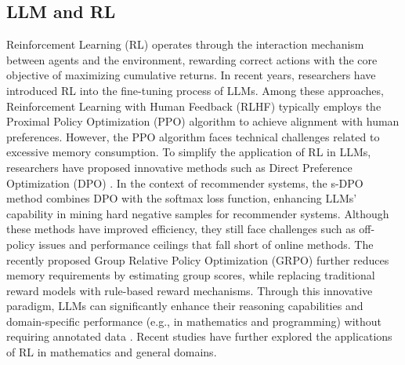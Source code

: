 \subsection{LLM and RL}
Reinforcement Learning (RL) \citep{RLsurvey, RLsurvey2} operates through the interaction mechanism between agents and the environment, rewarding correct actions with the core objective of maximizing cumulative returns. In recent years, researchers have introduced RL into the fine-tuning process of LLMs. Among these approaches, Reinforcement Learning with Human Feedback (RLHF) \citep{RLHF} typically employs the Proximal Policy Optimization (PPO) \citep{PPO} algorithm to achieve alignment with human preferences. However, the PPO algorithm faces technical challenges related to excessive memory consumption. To simplify the application of RL in LLMs, researchers have proposed innovative methods such as Direct Preference Optimization (DPO) \citep{DPO}. In the context of recommender systems, the s-DPO method \citep{sdpo} combines DPO with the softmax loss function, enhancing LLMs' capability in mining hard negative samples for recommender systems. Although these methods have improved efficiency, they still face challenges such as off-policy issues and performance ceilings that fall short of online methods. The recently proposed Group Relative Policy Optimization (GRPO) \citep{deepseekmath} further reduces memory requirements by estimating group scores, while replacing traditional reward models with rule-based reward mechanisms. Through this innovative paradigm, LLMs can significantly enhance their reasoning capabilities and domain-specific performance (e.g., in mathematics and programming) without requiring annotated data \citep{Deepseek-r1, o1}. Recent studies \citep{R1-searcher, rm-r1, search-r1, RecZero} have further explored the applications of RL in mathematics and general domains.

